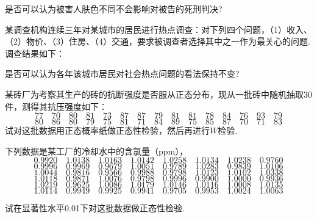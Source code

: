 \begin{xiti}
是否可以认为被害人肤色不同不会影响对被告的死刑判决?

\item 某调查机构连续三年对某城市的居民进行热点调查：对下列四个问题，（1）收入、（2）物价、（3）住房、（4）交通，要求被调查者选择其中之一作为最关心的问题.调查结果如下：

是否可以认为各年该城市居民对社会热点问题的看法保持不变?

\item 某砖厂为考察其生产的砖的抗断强度是否服从正态分布，现从一批砖中随机抽取30件，测得其抗压强度如下：
\[77 \quad 70 \quad 80 \quad 81 \quad 73 \quad 87 \quad 87 \quad 79 \quad 81 \quad 81 \quad78 \quad 84 \quad 76 \quad 93 \quad 79\]
\[80 \quad 86 \quad 80 \quad 79 \quad 75 \quad 81 \quad 71 \quad 84 \quad 89 \quad 75 \quad 85 \quad 87 \quad 70 \quad 71 \quad 83\]
试对这批数据用正态概率纸做正态性检验，然后再进行$W$检验.

\item 下列数据是某工厂的冷却水中的含氯量（ppm），
\[
0.9920\quad 1.0138\quad 1.0163\quad 1.0142\quad 1.0258\quad 1.0134\quad 1.0238\quad 0.9760
\]
\[
0.9996\quad 0.9969\quad 0.9679\quad 1.0051\quad 0.9789\quad 1.0283\quad 0.9839\quad 1.0106
\]
\[
1.0044\quad 0.9816\quad 0.9566\quad 0.9988\quad 0.9798\quad 1.0123\quad 1.0102\quad 1.0338
\]
\[
1.0118\quad 0.9871\quad 1.0076\quad 0.9798\quad 0.9996\quad 0.9900\quad 1.0000\quad 0.9936
\]
\[
1.0219\quad 0.9625\quad 1.0086\quad 1.0179\quad 1.0146\quad 1.0116\quad 1.0008\quad 1.0135
\]
\[
1.0114\quad 0.9949\quad 0.9925\quad 0.9941\quad 0.9705\quad 0.9953\quad 1.0024\quad 1.0063
\]

试在显著性水平0.01下对这批数据做正态性检验.
\end{xiti} 